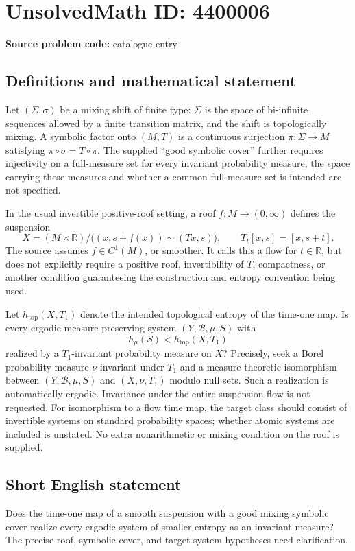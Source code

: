 \documentclass[11pt]{article}
\begin{document}
\section*{UnsolvedMath ID: 4400006}
\textbf{Source problem code:} catalogue entry
\subsection{Definitions and mathematical statement}
Let $(\Sigma,\sigma)$ be a mixing shift of finite type: $\Sigma$ is the space of bi-infinite sequences allowed by a finite transition matrix, and the shift is topologically mixing. A symbolic factor onto $(M,T)$ is a continuous surjection $\pi:\Sigma\to M$ satisfying $\pi\circ\sigma=T\circ\pi$. The supplied ``good symbolic cover'' further requires injectivity on a full-measure set for every invariant probability measure; the space carrying these measures and whether a common full-measure set is intended are not specified.

In the usual invertible positive-roof setting, a roof $f:M\to(0,\infty)$ defines the suspension
\[
X=(M\times\mathbb R)/\bigl((x,s+f(x))\sim(Tx,s)\bigr),\qquad T_t[x,s]=[x,s+t].
\]
The source assumes $f\in C^1(M)$, or smoother. It calls this a flow for $t\in\mathbb R$, but does not explicitly require a positive roof, invertibility of $T$, compactness, or another condition guaranteeing the construction and entropy convention being used.

Let $h_{\mathrm{top}}(X,T_1)$ denote the intended topological entropy of the time-one map. Is every ergodic measure-preserving system $(Y,\mathcal B,\mu,S)$ with
\[
h_\mu(S)<h_{\mathrm{top}}(X,T_1)
\]
realized by a $T_1$-invariant probability measure on $X$? Precisely, seek a Borel probability measure $\nu$ invariant under $T_1$ and a measure-theoretic isomorphism between $(Y,\mathcal B,\mu,S)$ and $(X,\nu,T_1)$ modulo null sets. Such a realization is automatically ergodic. Invariance under the entire suspension flow is not requested. For isomorphism to a flow time map, the target class should consist of invertible systems on standard probability spaces; whether atomic systems are included is unstated. No extra nonarithmetic or mixing condition on the roof is supplied.
\subsection{Short English statement}
Does the time-one map of a smooth suspension with a good mixing symbolic cover realize every ergodic system of smaller entropy as an invariant measure? The precise roof, symbolic-cover, and target-system hypotheses need clarification.
\end{document}
